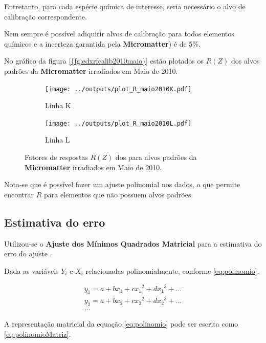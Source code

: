 Entretanto, para cada espécie química de interesse, seria necessário 
o alvo de calibração correspondente.

Nem sempre é possível adiquirir alvos de calibração para todos elementos
químicos e a incerteza garantida pela \textbf{Micromatter}) é de 5\%. 

No gráfico da figura \ref{{fg:edxrfcalib2010maio}} estão plotados os $R(Z)$ 
dos alvos padrões da \textbf{Micromatter} irradiados em Maio de 2010. 

\begin{figure}[H]
  \begin{subfigure}[b]{0.45\textwidth}
    \texttt{[image: ../outputs/plot\_R\_maio2010K.pdf]}
    \caption{Linha K}
  \end{subfigure}%
  \begin{subfigure}[b]{0.45\textwidth}
    \texttt{[image: ../outputs/plot\_R\_maio2010L.pdf]}
    \caption{Linha L}
  \end{subfigure}
  \caption{Fatores de respostas $R(Z)$ dos para alvos padrões da 
           \textbf{Micromatter} irradiados em Maio de 2010. 
           \label{fg:edxrfcalib2010maio}}
\end{figure}

Nota-se que é possível fazer um ajuste polinomial nos dados, o que 
permite encontrar $R$ para elementos que não possuem alvos padrões.

\subsection{Estimativa do erro}

Utilizou-se o \textbf{Ajuste dos Mínimos Quadrados Matricial} 
para a estimativa do erro do ajuste \citep{helene2006}.

Dada as variáveis $Y_i$ e $X_i$ relacionadas polinomialmente, 
conforme \ref{eq:polinomio}.

\begin{equation}
  \label{eq:polinomio}
  \begin{split}
    y_1 = a + b x_1 + c{x_1}^2 + d{x_1}^3 + ...\\
    y_2 = a + b x_2 + c{x_2}^2 + d{x_2}^3 + ... \\
    ...
  \end{split}
\end{equation}

A representação matricial da equação \ref{eq:polinomio} pode 
ser escrita como \ref{eq:polinomioMatriz}.

